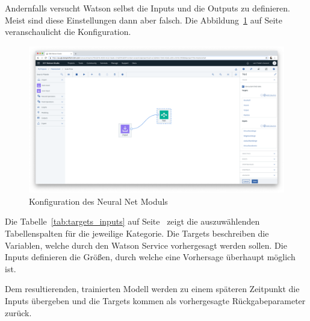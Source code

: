 Andernfalls versucht Watson selbst die Inputs und die Outputs zu definieren. Meist sind diese Einstellungen dann
aber falsch. Die Abbildung~\ref{fig:umsetzung_config_neural_net} auf Seite~\pageref{fig:umsetzung_config_neural_net}
veranschaulicht die Konfiguration.

\begin{figure}[h]
    \centering
    \includegraphics[width=\textwidth]{images/kapitel_3/umsetzung_config_neural_net.png}
    \caption{Konfiguration des Neural Net Moduls}
    \label{fig:umsetzung_config_neural_net}
\end{figure}

Die Tabelle~\ref{tab:targets_inputs} auf Seite~\pageref{tab:targets_inputs} zeigt die auszuwählenden Tabellenspalten für
die jeweilige Kategorie. Die Targets beschreiben die Variablen, welche durch den Watson Service vorhergesagt werden
sollen. Die Inputs definieren die Größen, durch welche eine Vorhersage überhaupt möglich ist.

Dem resultierenden, trainierten Modell werden zu einem späteren Zeitpunkt die Inputs übergeben und die Targets kommen
als vorhergesagte Rückgabeparameter zurück.

